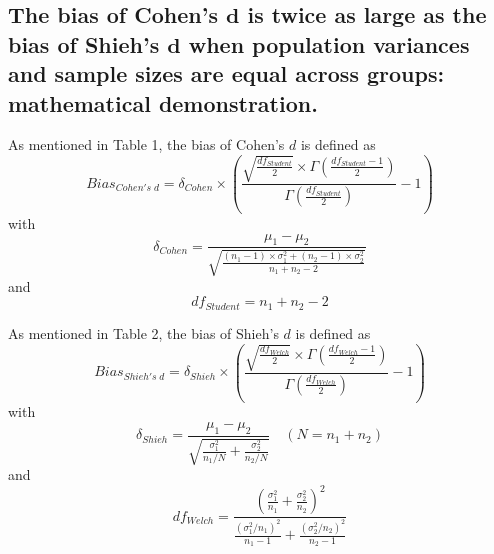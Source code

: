 \documentclass[
  english,
  man,floatsintext]{apa6}
\begin{document}
\endgroup


\clearpage
\makeatletter
\efloat@restorefloats
\makeatother


\begin{appendix}
\section{}
\hypertarget{the-bias-of-cohens-bmd-is-twice-as-large-as-the-bias-of-shiehs-bmd-when-population-variances-and-sample-sizes-are-equal-across-groups-mathematical-demonstration.}{%
\subsection{\texorpdfstring{The bias of Cohen's \(\bm{d}\) is twice as
large as the bias of Shieh's \(\bm{d}\) when population variances and
sample sizes are equal across groups: mathematical
demonstration.}{The bias of Cohen's \textbackslash bm\{d\} is twice as large as the bias of Shieh's \textbackslash bm\{d\} when population variances and sample sizes are equal across groups: mathematical demonstration.}}\label{the-bias-of-cohens-bmd-is-twice-as-large-as-the-bias-of-shiehs-bmd-when-population-variances-and-sample-sizes-are-equal-across-groups-mathematical-demonstration.}}

As mentioned in Table 1, the bias of Cohen's \(d\) is defined as
\begin{equation} 
Bias_{Cohen's \; d}= \delta_{Cohen} \times \left( \frac{\sqrt{\frac{df_{Student}}{2}} \times \Gamma{\left(\frac{df_{Student}-1}{2}\right)}}{\Gamma{\left( \frac{df_{Student}}{2}\right)}} -1 \right)
\label{eq:Cohenbias}
\end{equation} with \begin{equation*} 
\delta_{Cohen}=\frac{\mu_1-\mu_2}{\sqrt{\frac{(n_1-1)\times \sigma^2_1+(n_2-1)\times\sigma^2_2}{n_1+n_2-2}}}
\label{eq:Cohendelta}
\end{equation*} and \begin{equation*} 
df_{Student}=n_1+n_2-2
\label{eq:Cohendf}
\end{equation*}

As mentioned in Table 2, the bias of Shieh's \(d\) is defined as
\begin{equation} 
Bias_{Shieh's \; d}=\delta_{Shieh} \times \left( \frac{\sqrt{\frac{df_{Welch}}{2}} \times \Gamma{\left(\frac{df_{Welch}-1}{2}\right)}}{\Gamma{\left( \frac{df_{Welch}}{2}\right)}} -1 \right)
\label{eq:Shiehbias}
\end{equation} with \begin{equation*} 
\delta_{Shieh}=\frac{\mu_1-\mu_2}{\sqrt{\frac{\sigma^2_1}{n_1/N}+\frac{\sigma^2_2}{n_2/N}}} \quad (N=n_1+n_2)
\label{eq:Shiehdelta}
\end{equation*} and \begin{equation*} 
df_{Welch}=\frac{\left(\frac{\sigma^2_1}{n_1}+\frac{\sigma^2_2}{n_2} \right)^2}{\frac{(\sigma^2_1/n_1)^2}{n_1-1}+\frac{(\sigma^2_2/n_2)^2}{n_2-1}}
\label{eq:Welchdf}
\end{equation*}


\end{appendix}
\end{document}
